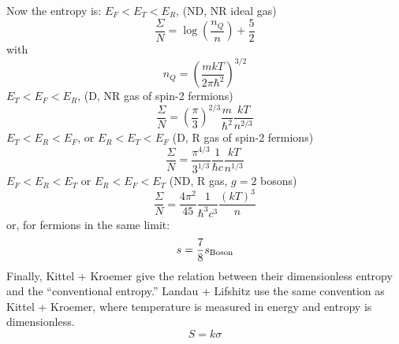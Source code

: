 \documentclass{emulateapj}
\newcommand{\scale}[2]{\left(\frac{#1}{#2}\right)}
\begin{document}
Now the entropy is:
$E_F < E_T < E_R$, (ND, NR ideal gas)
\begin{equation}
  \frac{\Sigma}{N} = \log\scale{n_Q}{n} + \frac{5}{2}
\end{equation}
with
\begin{equation}
  n_Q = \scale{m k T}{2\pi \hbar^2}^{3/2}
\end{equation}
$E_T < E_F < E_R$, (D, NR gas of spin-2 fermions)
\begin{equation}
 \frac{\Sigma}{N} = \scale{\pi}{3}^{2/3} \frac{m}{\hbar^2} \frac{k T}{n^{2/3}}
\end{equation}
$E_T < E_R < E_F$, or $E_R < E_T < E_F$ (D, R gas of spin-2 fermions)
\begin{equation}
  \frac{\Sigma}{N} = \frac{\pi^{4/3}}{3^{1/3}} 
  \frac{1}{\hbar c}
  \frac{k T}{n^{1/3}}
\end{equation}
$E_F < E_R < E_T$ or $E_R < E_F < E_T$ (ND, R gas, $g=2$ bosons)
\begin{equation}
  \frac{\Sigma}{N}  = \frac{4 \pi^2}{45} \frac{1}{\hbar^3 c^3} \frac{(kT)^3}{n} 
\end{equation}
or, for fermions in the same limit:
\begin{equation}
  s = \frac{7}{8} s_{\rm Boson}
\end{equation}
Finally, Kittel + Kroemer give the relation between their
dimensionless entropy and the ``conventional entropy.''  Landau +
Lifshitz use the same convention as Kittel + Kroemer, where
temperature is measured in energy and entropy is dimensionless.
\begin{equation}
  S = k \sigma
\end{equation}
\end{document}
